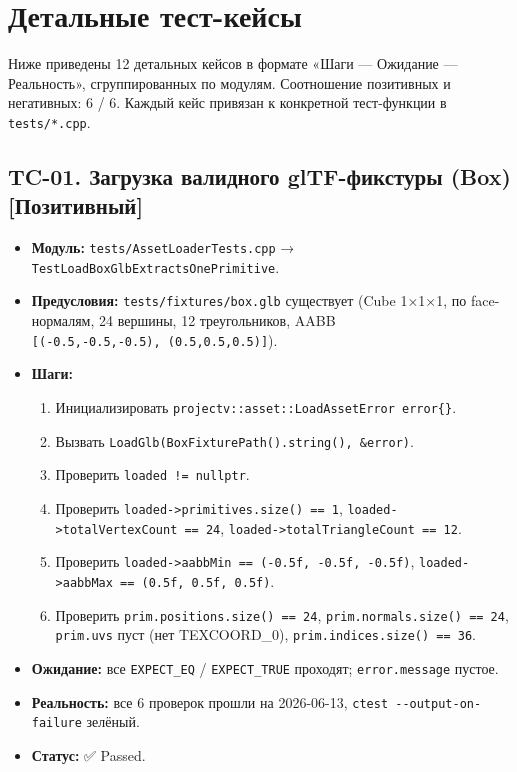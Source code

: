 \section{Детальные тест-кейсы}\label{KT-2.2_Test_Report-ux434ux435ux442ux430ux43bux44cux43dux44bux435-ux442ux435ux441ux442-ux43aux435ux439ux441ux44b}

Ниже приведены 12 детальных кейсов в формате «Шаги --- Ожидание --- Реальность», сгруппированных по модулям. Соотношение позитивных и негативных: 6 / 6. Каждый кейс привязан к конкретной тест-функции в \texttt{tests/*.cpp}.

\subsection{TC-01. Загрузка валидного glTF-фикстуры (Box) {[}Позитивный{]}}\label{KT-2.2_Test_Report-tc-01-ux437ux430ux433ux440ux443ux437ux43aux430-ux432ux430ux43bux438ux434ux43dux43eux433ux43e-gltf-ux444ux438ux43aux441ux442ux443ux440ux44b-box-ux43fux43eux437ux438ux442ux438ux432ux43dux44bux439}

\begin{itemize}
\tightlist
\item
  \textbf{Модуль:} \texttt{tests/AssetLoaderTests.cpp} → \texttt{TestLoadBoxGlbExtractsOnePrimitive}.
\item
  \textbf{Предусловия:} \texttt{tests/fixtures/box.glb} существует (Cube 1×1×1, по face-нормалям, 24 вершины, 12 треугольников, AABB \texttt{{[}(-0.5,-0.5,-0.5),\ (0.5,0.5,0.5){]}}).
\item
  \textbf{Шаги:}

  \begin{enumerate}
  \def\labelenumi{\arabic{enumi}.}
  \tightlist
  \item
    Инициализировать \texttt{projectv::asset::LoadAssetError\ error\{\}}.
  \item
    Вызвать \texttt{LoadGlb(BoxFixturePath().string(),\ \&error)}.
  \item
    Проверить \texttt{loaded\ !=\ nullptr}.
  \item
    Проверить \texttt{loaded-\textgreater{}primitives.size()\ ==\ 1}, \texttt{loaded-\textgreater{}totalVertexCount\ ==\ 24}, \texttt{loaded-\textgreater{}totalTriangleCount\ ==\ 12}.
  \item
    Проверить \texttt{loaded-\textgreater{}aabbMin\ ==\ (-0.5f,\ -0.5f,\ -0.5f)}, \texttt{loaded-\textgreater{}aabbMax\ ==\ (0.5f,\ 0.5f,\ 0.5f)}.
  \item
    Проверить \texttt{prim.positions.size()\ ==\ 24}, \texttt{prim.normals.size()\ ==\ 24}, \texttt{prim.uvs} пуст (нет TEXCOORD\_0), \texttt{prim.indices.size()\ ==\ 36}.
  \end{enumerate}
\item
  \textbf{Ожидание:} все \texttt{EXPECT\_EQ} / \texttt{EXPECT\_TRUE} проходят; \texttt{error.message} пустое.
\item
  \textbf{Реальность:} все 6 проверок прошли на 2026-06-13, \texttt{ctest\ -\/-output-on-failure} зелёный.
\item
  \textbf{Статус:} ✅ Passed.
\end{itemize}

